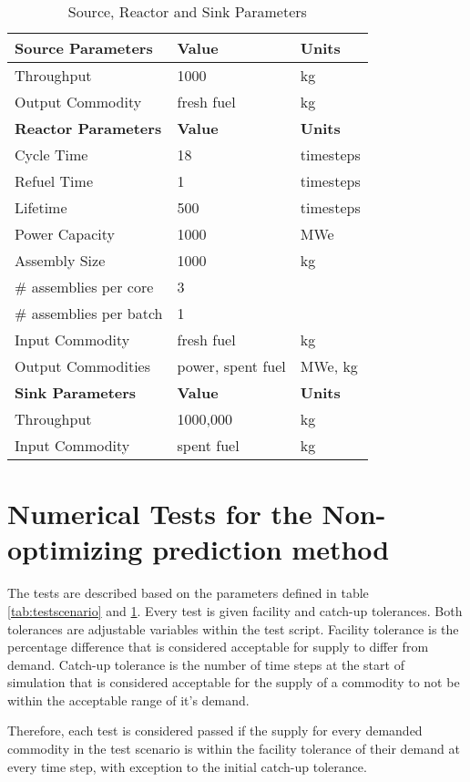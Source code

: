 \documentclass[11pt,letterpaper]{article}
\begin{document}
\begin{table}[H]
	\centering
    \caption {Source, Reactor and Sink Parameters}
	\label{tab:reactor}
	\begin{tabular}{|l|l|l|}
\hline
\textbf{Source Parameters} & \textbf{Value} & \textbf{Units} \\
\hline
Throughput & 1000 & kg \\
Output Commodity & fresh fuel & kg\\
\hline
\textbf{Reactor Parameters} & \textbf{Value} & \textbf{Units} \\
\hline
Cycle Time & 18 & timesteps \\
Refuel Time & 1 & timesteps \\
Lifetime & 500 & timesteps \\
Power Capacity & 1000 & MWe \\
Assembly Size & 1000 & kg \\
\# assemblies per core & 3 & \\
\# assemblies per batch & 1 & \\
Input Commodity & fresh fuel & kg\\
Output Commodities & power, spent fuel & MWe, kg\\
\hline
\textbf{Sink Parameters} & \textbf{Value} & \textbf{Units} \\
Throughput & 1000,000 & kg \\
Input Commodity & spent fuel & kg\\
\hline
	\end{tabular}
\end{table}

\pagebreak

\section{Numerical Tests for the Non-optimizing prediction method}
The tests are described based on the parameters defined in table \ref{tab:testscenario} and \ref{tab:reactor}. Every test is given facility and catch-up tolerances. Both tolerances are adjustable variables within the test script. Facility tolerance is the percentage difference that is considered acceptable for supply to differ from demand.  Catch-up tolerance is the number of time steps at the start of simulation that is considered acceptable for the supply of a commodity to not be within the acceptable range of it's demand. 

Therefore, each test is considered passed if the supply for every demanded commodity in the test scenario is within the facility tolerance of their demand at every time step, with exception to the initial catch-up tolerance.   
\end{document}
